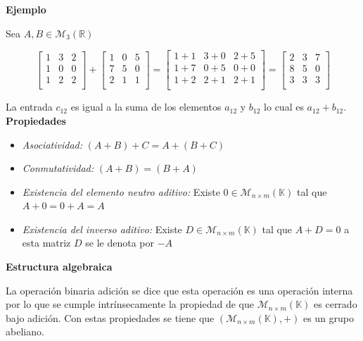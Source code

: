 \documentclass[10pt]{article}
\begin{document}
\noindent \textbf{Ejemplo}

Sea $A, B \in \mathcal{M_3}(\mathbb{R})$

$$
\begin{bmatrix}
1 & 3 & 2 \\
1 & 0 & 0 \\
1 & 2 & 2 \\
\end{bmatrix}
+
\begin{bmatrix}
1 & 0 & 5 \\
7 & 5 & 0 \\
2 & 1 & 1 \\
\end{bmatrix}
=
\begin{bmatrix}
1+1 & 3+0 & 2+5 \\
1+7 & 0+5 & 0+0 \\
1+2 & 2+1 & 2+1 \\
\end{bmatrix}
=
\begin{bmatrix}
2 & 3 & 7 \\
8 & 5 & 0 \\
3 & 3 & 3 \\
\end{bmatrix}
$$

La entrada $c_{12}$ es igual a la suma de los elementos $a_{12}$ y $b_{12}$ lo cual es $a_{12} + b_{12}$. \\

\noindent\textbf{Propiedades}

\begin{itemize}
\item \textit{Asociatividad:} $( A + B) + C = A + (B + C)$
\item \textit{Conmutatividad:} $(A + B) = (B + A)$
\item \textit{Existencia del elemento neutro aditivo:} Existe $0\in \mathcal{M}_{n\times {m}}(\mathbb{K})$ tal que $A + 0 = 0 + A = A$
\item \textit{Existencia del inverso aditivo:} Existe $D\in \mathcal{M}_{n\times {m}}(\mathbb{K})$ tal que $A + D = 0$ a esta matriz $D$ se le denota por $-A$
\end{itemize}

\noindent\textbf{Estructura algebraica}

La operación binaria adición se dice que esta operación es una operación interna por lo que se cumple intrínsecamente la propiedad de que $\mathcal{M}_{n\times {m}}(\mathbb{K})$ es cerrado bajo adición. Con estas propiedades se tiene que $(\mathcal{M}_{n\times {m}}(\mathbb{K}), + )$ es un grupo abeliano.
\end{document}
